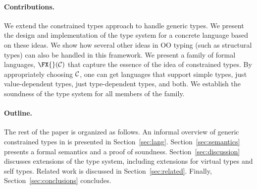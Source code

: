 \paragraph{Contributions.}
We extend the constrained types approach to handle generic types.  We
present the design and implementation of the type system for a
concrete language \Xten{} based on these ideas. We show how several
other ideas in OO typing (such as structural types) can also be
handled in this framework. We present a family of formal languages,
$\FX{}(\cal C)$ that capture the essence of the idea of constrained
types. By appropriately choosing $\cal C$, one can get languages that
support simple types, just value-dependent types, just type-dependent
types, and both. We establish the soundness of the type system for all
members of the family.

\paragraph{Outline.}

The rest of the paper is organized as follows.
%
An informal overview of generic constrained types in \Xten{}
is presented in
Section~\ref{sec:lang}.
%
%
Section~\ref{sec:semantics} presents a formal semantics and a
proof of soundness.
%
Section~\ref{sec:discussion} discusses extensions of the type system,
including extensions for virtual types and self types.
%
Related work is discussed in Section~\ref{sec:related}.
%
Finally, Section~\ref{sec:conclusions} concludes.


